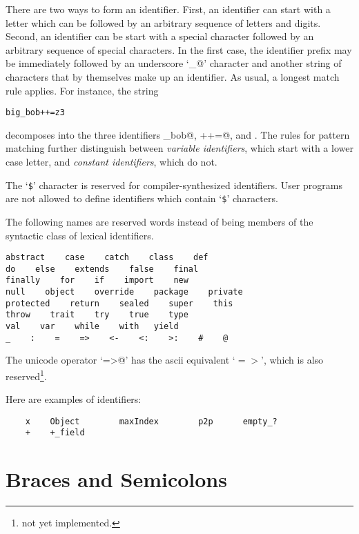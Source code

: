 \documentclass[a4paper,12pt,twoside,titlepage]{book}
\newcommand{\notyet}{\footnote{not yet implemented.}}
\begin{document}
There are two ways to form an identifier. First, an identifier can
start with a letter which can be followed by an arbitrary sequence of
letters and digits. Second, an identifier can be start with a special
character followed by an arbitrary sequence of special characters.  In
the first case, the identifier prefix may be immediately followed by
an underscore `\lstinline@_@' character and another string of
characters that by themselves make up an identifier.  As usual, a
longest match rule applies. For instance, the string

\begin{lstlisting}
big_bob++=z3
\end{lstlisting}

decomposes into the three identifiers \lstinline@big_bob@, \lstinline@++=@, and
.  The rules for pattern matching further distinguish between
{\em variable identifiers}, which start with a lower case letter, and
{\em constant identifiers}, which do not.


The `\lstinline[mathescape=false]@$@'\comment{$} character is reserved for compiler-synthesized identifiers.
User programs are not allowed to define identifiers which contain `\lstinline[mathescape=false]@$@'\comment{$}
characters. 

The following names are reserved words instead of being members of the
syntactic class  of lexical identifiers.

\begin{lstlisting}
abstract    case    catch    class    def    
do    else    extends    false    final    
finally    for    if    import    new    
null    object    override    package    private    
protected    return    sealed    super    this    
throw    trait    try    true    type    
val    var    while    with   yield
_    :    =    =>    <-    <:    >:    #    @
\end{lstlisting}

The unicode operator `\lstinline@=>@' has the ascii equivalent
`$=>$', which is also reserved\notyet.

\example
Here are examples of identifiers:
\begin{lstlisting}
    x    Object        maxIndex        p2p      empty_?
    +    +_field
\end{lstlisting}

\section{Braces and Semicolons}
\end{document}

